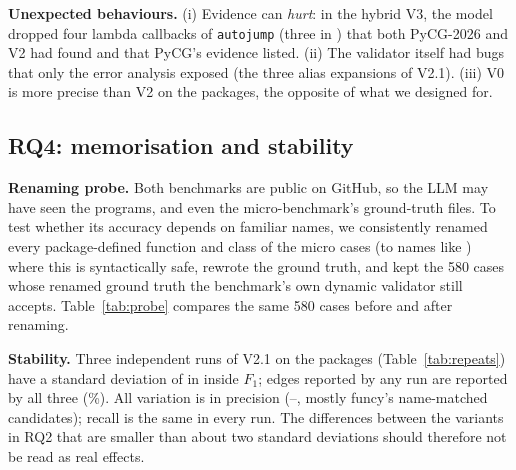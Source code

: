 \textbf{Unexpected behaviours.} (i) Evidence can \emph{hurt}: in the hybrid
V3, the model dropped four lambda callbacks of \texttt{autojump} (three in
) that both PyCG-2026 and V2 had found and that
PyCG's evidence listed. (ii) The validator itself had bugs that only
the error analysis exposed (the three alias expansions of V2.1). (iii) V0 is
more precise than V2 on the packages, the opposite of what we designed for.


\subsection{RQ4: memorisation and stability}
\label{sec:rq4}

\textbf{Renaming probe.} Both benchmarks are public on GitHub, so the LLM may
have seen the programs, and even the micro-benchmark's ground-truth files. To
test whether its accuracy depends on familiar names, we consistently renamed
every package-defined function and class of the micro cases (to names like
) where this is syntactically safe, rewrote the ground truth,
and kept the 580 cases whose renamed ground truth the benchmark's own dynamic
validator still accepts. Table~\ref{tab:probe} compares the same 580 cases
before and after renaming.

\begin{table}[t]
  \caption{Renaming probe on 580 micro cases (inside edges; all-edge $F_1$;
  exact cases). Symbolic tools are name-invariant by construction, so their rows are a sanity check.}
  \label{tab:probe}
  \setlength{\tabcolsep}{3pt}
  \resizebox{\columnwidth}{!}{}
\end{table}



\textbf{Stability.} Three independent runs of V2.1 on the packages
(Table~\ref{tab:repeats}) have a standard deviation of  in
inside $F_1$;  edges reported by any run are reported by all
three (\%). All variation is in precision
(--, mostly funcy's name-matched
 candidates); recall is the same in every run. The differences between the variants in RQ2 that
are smaller than about two standard deviations should therefore not be read
as real effects.

